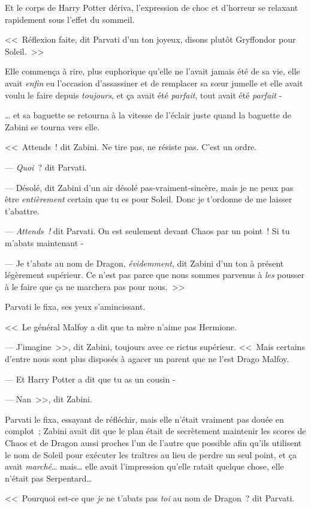 Et le corps de Harry Potter dériva, l'expression de choc et d'horreur se relaxant rapidement sous l'effet du sommeil.

<<~Réflexion faite, dit Parvati d'un ton joyeux, disons plutôt Gryffondor pour Soleil.~>>

Elle commença à rire, plus euphorique qu'elle ne l'avait jamais été de sa vie, elle avait \emph{enfin} eu l'occasion d'assassiner et de remplacer sa sœur jumelle et elle avait voulu le faire depuis \emph{toujours}, et ça avait été \emph{parfait}, tout avait été \emph{parfait} -

… et sa baguette se retourna à la vitesse de l'éclair juste quand la baguette de Zabini se tourna vers elle.

<<~Attends~! dit Zabini. Ne tire pas, ne résiste pas. C'est un ordre.

--- \emph{Quoi}~? dit Parvati.

--- Désolé, dit Zabini d'un air désolé pas-vraiment-sincère, mais je ne peux pas être \emph{entièrement} certain que tu es pour Soleil. Donc je t'ordonne de me laisser t'abattre.

--- \emph{Attends~!} dit Parvati. On est seulement devant Chaos par un point~! Si tu m'abats maintenant -

--- Je t'abats au nom de Dragon, \emph{évidemment}, dit Zabini d'un ton à présent légèrement supérieur. Ce n'est pas parce que nous sommes parvenus à \emph{les} pousser à le faire que ça ne marchera pas pour nous.~>>

Parvati le fixa, ses yeux s'amincissant.

<<~Le général Malfoy a dit que ta mère n'aime pas Hermione.

--- J'imagine~>>, dit Zabini, toujours avec ce rictus supérieur. <<~Mais certains d'entre nous sont plus disposés à agacer un parent que ne l'est Drago Malfoy.

--- Et Harry Potter a dit que tu as un cousin -

--- Nan~>>, dit Zabini.

Parvati le fixa, essayant de réfléchir, mais elle n'était vraiment pas douée en complot~; Zabini avait dit que le plan était de secrètement maintenir les scores de Chaos et de Dragon aussi proches l'un de l'autre que possible afin qu'ils utilisent le nom de Soleil pour exécuter les traîtres au lieu de perdre un seul point, et ça avait \emph{marché}… mais… elle avait l'impression qu'elle ratait quelque chose, elle n'était pas Serpentard…

<<~Pourquoi est-ce que \emph{je} ne t'abats pas \emph{toi} au nom de Dragon~? dit Parvati.

